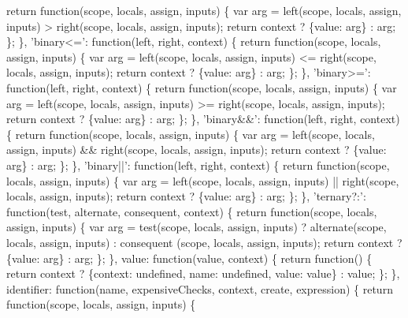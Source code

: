 \begin{DoxyCodeInclude}
{{{{    \textcolor{keywordflow}{return} \textcolor{keyword}{function}(scope, locals, assign, inputs) \{
      var arg = left(scope, locals, assign, inputs) > right(scope, locals, assign, inputs);
      \textcolor{keywordflow}{return} context ? \{value: arg\} : arg;
    \};
  \},
  \textcolor{stringliteral}{'binary<='}: \textcolor{keyword}{function}(left, right, context) \{
    \textcolor{keywordflow}{return} \textcolor{keyword}{function}(scope, locals, assign, inputs) \{
      var arg = left(scope, locals, assign, inputs) <= right(scope, locals, assign, inputs);
      \textcolor{keywordflow}{return} context ? \{value: arg\} : arg;
    \};
  \},
  \textcolor{stringliteral}{'binary>='}: \textcolor{keyword}{function}(left, right, context) \{
    \textcolor{keywordflow}{return} \textcolor{keyword}{function}(scope, locals, assign, inputs) \{
      var arg = left(scope, locals, assign, inputs) >= right(scope, locals, assign, inputs);
      \textcolor{keywordflow}{return} context ? \{value: arg\} : arg;
    \};
  \},
  \textcolor{stringliteral}{'binary&&'}: \textcolor{keyword}{function}(left, right, context) \{
    \textcolor{keywordflow}{return} \textcolor{keyword}{function}(scope, locals, assign, inputs) \{
      var arg = left(scope, locals, assign, inputs) && right(scope, locals, assign, inputs);
      \textcolor{keywordflow}{return} context ? \{value: arg\} : arg;
    \};
  \},
  \textcolor{stringliteral}{'binary||'}: \textcolor{keyword}{function}(left, right, context) \{
    \textcolor{keywordflow}{return} \textcolor{keyword}{function}(scope, locals, assign, inputs) \{
      var arg = left(scope, locals, assign, inputs) || right(scope, locals, assign, inputs);
      \textcolor{keywordflow}{return} context ? \{value: arg\} : arg;
    \};
  \},
  \textcolor{stringliteral}{'ternary?:'}: \textcolor{keyword}{function}(test, alternate, consequent, context) \{
    \textcolor{keywordflow}{return} \textcolor{keyword}{function}(scope, locals, assign, inputs) \{
      var arg = test(scope, locals, assign, inputs) ? alternate(scope, locals, assign, inputs) : consequent
      (scope, locals, assign, inputs);
      \textcolor{keywordflow}{return} context ? \{value: arg\} : arg;
    \};
  \},
  value: \textcolor{keyword}{function}(value, context) \{
    \textcolor{keywordflow}{return} \textcolor{keyword}{function}() \{ \textcolor{keywordflow}{return} context ? \{context: undefined, name: undefined, value: value\} : value; \};
  \},
  identifier: \textcolor{keyword}{function}(name, expensiveChecks, context, create, expression) \{
    \textcolor{keywordflow}{return} \textcolor{keyword}{function}(scope, locals, assign, inputs) \{
}}}}
\end{DoxyCodeInclude}
